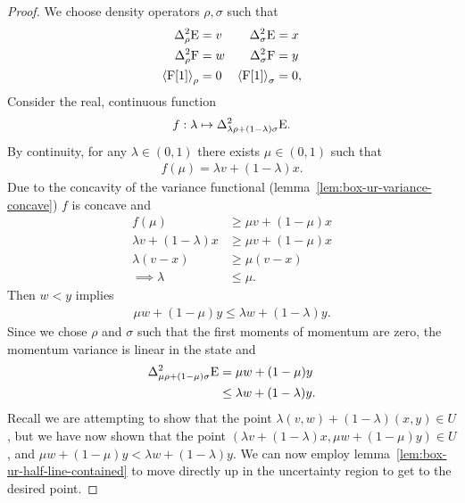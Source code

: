 \begin{proof}
  We choose density operators $\rho,\sigma$ such that
  \begin{align}
    \var[\rho]{\ope} &= v & \var[\sigma]{\ope} &= x \\
    \var[\rho]{\opf} &= w & \var[\sigma]{\opf} &= y \\
    \expe{\opf[1]}{\rho} &= 0 & \expe{\opf[1]}{\sigma} &= 0,
  \end{align}
  Consider the real, continuous function
  \begin{align}
    f:\lambda \mapsto \var[\lambda\rho+ (1-\lambda)\sigma]{\ope}.
  \end{align} 
  By continuity, for any $\lambda\in (0,1)$ there exists $\mu\in (0,1)$ such that
  \begin{align}
    f(\mu) = \lambda v + (1-\lambda)x.
  \end{align}
  Due to the concavity of the variance functional (lemma~\ref{lem:box-ur-variance-concave}) $f$ is concave and 
  \begin{align}
    f(\mu) &\geq \mu v + (1-\mu)x\\
    \lambda v + (1-\lambda)x &\geq \mu v + (1-\mu)x\\
    \lambda (v-x) &\geq \mu(v-x)\\
    \implies \lambda &\leq \mu.
  \end{align}
  Then $w < y$ implies
  \begin{align}
    \mu w + (1-\mu) y \leq \lambda w + (1-\lambda)y.
  \end{align}
  Since we chose $\rho$ and $\sigma$ such that the first moments of momentum are zero, the momentum variance is linear in the state and
  \begin{align}
    \var[\mu\rho+ (1-\mu)\sigma]{\ope} &= \mu w + (1-\mu) y\\
                                           &\leq \lambda w + (1-\lambda)y.
  \end{align}
  Recall we are attempting to show that the point $\lambda(v,w) + (1-\lambda)(x,y)\in U$, but we have now shown that the point $(\lambda v + (1-\lambda) x, \mu w + (1-\mu) y)\in U$, and $\mu w + (1-\mu) y < \lambda w + (1-\lambda)y$. We can now employ lemma~\ref{lem:box-ur-half-line-contained} to move directly up in the uncertainty region to get to the desired point.
\end{proof}


